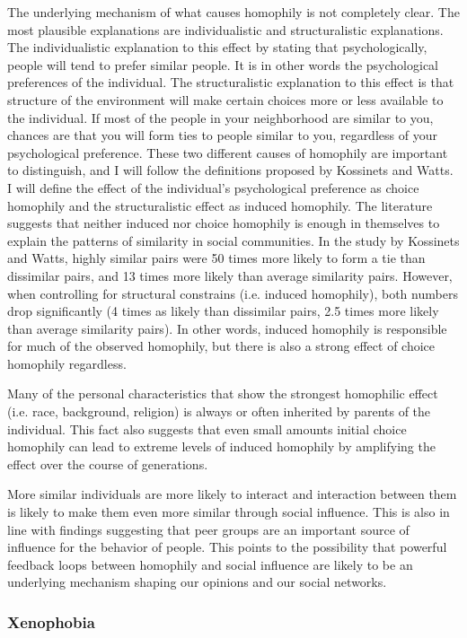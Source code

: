 \documentclass[9pt,twocolumn,twoside]{ilcss}
\begin{document}
The underlying mechanism of what causes homophily is not completely clear. The most plausible explanations are individualistic and structuralistic explanations. 
The individualistic explanation to this effect by stating that psychologically, people will tend to prefer similar people. It is in other words the psychological preferences of the individual. 
The structuralistic explanation to this effect is that structure of the environment will make certain choices more or less available to the individual. 
If most of the people in your neighborhood are similar to you, chances are that you will form ties to people similar to you, regardless of your psychological preference. 
These two different causes of homophily are important to distinguish, and I will follow the definitions proposed by Kossinets and Watts. 
I will define the effect of the individual's psychological preference as choice homophily and the structuralistic effect as induced homophily. 
The literature suggests that neither induced nor choice homophily is enough in themselves to explain the patterns of similarity in social communities.
In the study by Kossinets and Watts, highly similar pairs were 50 times more likely to form a tie than dissimilar pairs, and 13 times more likely than average similarity pairs. However, when controlling for structural constrains (i.e. induced homophily), both numbers drop significantly (4 times as likely than dissimilar pairs, 2.5 times more likely than average similarity pairs).
In other words, induced homophily is responsible for much of the observed homophily, but there is also a strong effect of choice homophily regardless. 

Many of the personal characteristics that show the strongest homophilic effect (i.e. race, background, religion) is always or often inherited by parents of the individual.
This fact also suggests that even small amounts initial choice homophily can lead to extreme levels of induced homophily by amplifying the effect over the course of generations. 

More similar individuals are more likely to interact and interaction between them is likely to make them even more similar through social influence. 
This is also in line with findings suggesting that peer groups are an important source of influence for the behavior of people. 
This points to the possibility that powerful feedback loops between homophily and social influence are likely to be an underlying mechanism shaping our opinions and our social networks. 

\subsubsection{Xenophobia}
\end{document}

